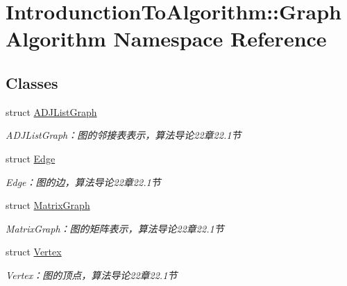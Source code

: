 \hypertarget{namespace_introdunction_to_algorithm_1_1_graph_algorithm}{}\section{Introdunction\+To\+Algorithm\+:\+:Graph\+Algorithm Namespace Reference}
\label{namespace_introdunction_to_algorithm_1_1_graph_algorithm}
\subsection*{Classes}
\begin{DoxyCompactItemize}
\item 
struct \hyperlink{struct_introdunction_to_algorithm_1_1_graph_algorithm_1_1_a_d_j_list_graph}{A\+D\+J\+List\+Graph}
\begin{DoxyCompactList}\small\item\em A\+D\+J\+List\+Graph：图的邻接表表示，算法导论22章22.1节 \end{DoxyCompactList}\item 
struct \hyperlink{struct_introdunction_to_algorithm_1_1_graph_algorithm_1_1_edge}{Edge}
\begin{DoxyCompactList}\small\item\em Edge：图的边，算法导论22章22.1节 \end{DoxyCompactList}\item 
struct \hyperlink{struct_introdunction_to_algorithm_1_1_graph_algorithm_1_1_matrix_graph}{Matrix\+Graph}
\begin{DoxyCompactList}\small\item\em Matrix\+Graph：图的矩阵表示，算法导论22章22.1节 \end{DoxyCompactList}\item 
struct \hyperlink{struct_introdunction_to_algorithm_1_1_graph_algorithm_1_1_vertex}{Vertex}
\begin{DoxyCompactList}\small\item\em Vertex：图的顶点，算法导论22章22.1节 \end{DoxyCompactList}\end{DoxyCompactItemize}
